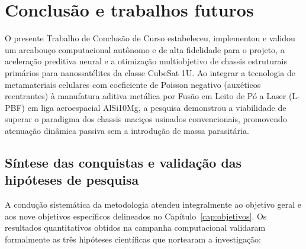 \chapter{Conclusão e trabalhos futuros}
\label{cap:conclusao}

O presente Trabalho de Conclusão de Curso estabeleceu, implementou e validou um arcabouço computacional autônomo e de alta fidelidade para o projeto, a aceleração preditiva neural e a otimização multiobjetivo de chassis estruturais primários para nanossatélites da classe CubeSat 1U. Ao integrar a tecnologia de metamateriais celulares com coeficiente de Poisson negativo (auxéticos reentrantes) à manufatura aditiva metálica por Fusão em Leito de Pó a Laser (L-PBF) em liga aeroespacial AlSi10Mg, a pesquisa demonstrou a viabilidade de superar o paradigma dos chassis maciços usinados convencionais, promovendo atenuação dinâmica passiva sem a introdução de massa parasitária.

\section{Síntese das conquistas e validação das hipóteses de pesquisa}
\label{sec:conquistas}

A condução sistemática da metodologia atendeu integralmente ao objetivo geral e aos nove objetivos específicos delineados no Capítulo~\ref{cap:objetivos}. Os resultados quantitativos obtidos na campanha computacional validaram formalmente as três hipóteses científicas que nortearam a investigação:

